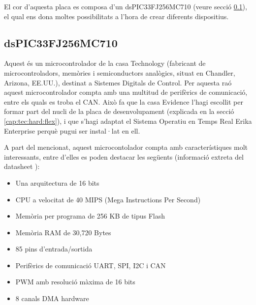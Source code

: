 El cor d'aquesta placa es composa d'un dsPIC33FJ256MC710 (veure secció \ref{cap:tec:hard:dspic}), el qual ens dona moltes possibilitats a l'hora de crear diferents dispositius.


\clearpage

\subsection{dsPIC33FJ256MC710}\label{cap:tec:hard:dspic}


Aquest és un microcontrolador de la casa \Microchip Technology (fabricant de microcontroladors, memòries i semiconductors analògics, situat en Chandler, Arizona, EE.UU.), destinat a Sistemes Digitals de Control. Per aquesta raó aquest microcontrolador compta amb una multitud de perifèrics de comunicació, entre els quals es troba el CAN. Això fa que la casa Evidence l'hagi escollit per formar part del nucli de la placa de desenvolupament \FLEX (explicada en la secció \ref{cap:tec:hard:flex}), i que s'hagi adaptat el Sistema Operatiu en Temps Real Erika Enterprise perquè pugui ser instal·lat en ell.

A part del mencionat, aquest microcontolador compta amb característiques molt interessants, entre d'elles es poden destacar les següents  (informació extreta del datasheet \cite{DataSheetdsPIC33}):

\begin{itemize}
	\item Una arquitectura de 16 bits
	\item CPU a velocitat de 40 MIPS (Mega Instructions Per Second)
	\item Memòria per programa de 256 KB de tipus Flash
	\item Memòria RAM de 30,720 Bytes
	\item 85 pins d'entrada/sortida
	\item Perifèrics de comunicació UART, SPI, I2C i CAN
	\item PWM amb resolució màxima de 16 bits
	\item 8 canals DMA hardware
\end{itemize}

